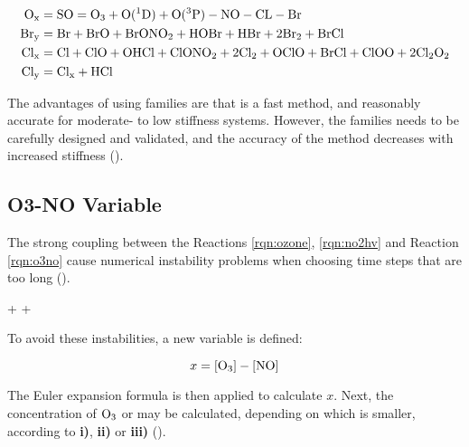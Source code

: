 \begin{align*}
    \mathrm{O_x} & = \mathrm{SO} = \mathrm{O_3} + \mathrm{O(^1D)} + \mathrm{O(^3P)} - \mathrm{NO} - \mathrm{CL} - \mathrm{Br} \\
    \mathrm{Br_y} & = \mathrm{Br} + \mathrm{BrO} + \mathrm{BrONO_2} + \mathrm{HOBr} + \mathrm{HBr} + 2\mathrm{Br_2} + \mathrm{BrCl} \\
    \mathrm{Cl_x} & = \mathrm{Cl} + \mathrm{ClO} + \mathrm{OHCl} + \mathrm{ClONO_2} + 2\mathrm{Cl_2} + \mathrm{OClO} + \mathrm{BrCl} + \mathrm{ClOO} + 2\mathrm{Cl_2O_2} \\
    \mathrm{Cl_y} & = \mathrm{Cl_x} + \mathrm{HCl}
\end{align*}

The advantages of using families are that is a fast method, and reasonably accurate for moderate- to low stiffness systems. However, the families needs to be carefully designed and validated, and the accuracy of the method decreases with increased stiffness (\cite{AtmModFund}).


\subsection{O3-NO Variable}\label{sec:O3-NO}

The strong coupling between the Reactions \ref{rqn:ozone}, \ref{rqn:no2hv} and Reaction \ref{rqn:o3no} cause numerical instability problems when choosing time steps that are too long (\cite{Hesstvedt1978}).

\begin{reaction}
     +  \rightarrow {} + 
    \label{rqn:o3no}
\end{reaction}

To avoid these instabilities, a new variable is defined: 

\begin{equation}
    x = [\mathrm{O_3}] - [\mathrm{NO}]
\end{equation}

The Euler expansion formula is then applied to calculate $x$. Next, the concentration of $\mathrm{O_3}$ or  may be calculated, depending on which is smaller, according to \textbf{i)}, \textbf{ii)} or \textbf{iii)} (\cite{Hesstvedt1978}). 